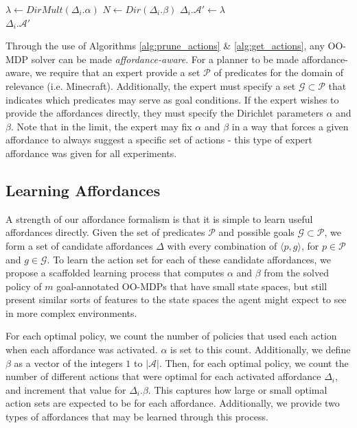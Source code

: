 \documentclass[conference]{IEEEtran}
\begin{document}
\begin{algorithm}
  \caption{$\Delta_i.getActions(s)$}
  \begin{algorithmic}[1]
    \State $\lambda \leftarrow DirMult(\Delta_i.\alpha)$
    \State $N \leftarrow Dir(\Delta_i.\beta)$
    \State $\Delta_i.\mathcal{A}' \leftarrow \lambda$
    \EndFor \\
    \Return $\Delta_i.\mathcal{A}'$
  \end{algorithmic}
  \label{alg:get_actions}
\end{algorithm}

Through the use of Algorithms \ref{alg:prune_actions} \& \ref{alg:get_actions}, any OO-MDP solver can be made
{\it affordance-aware}. For a planner to be made affordance-aware, we require that an expert provide a set $\mathcal{P}$ of predicates
for the domain of relevance (i.e. Minecraft). Additionally, the expert must specify a set
$\mathcal{G} \subset \mathcal{P}$ that indicates which predicates may serve as goal conditions. If the expert wishes
to provide the affordances directly, they must specify the Dirichlet parameters $\alpha$ and $\beta$. Note that
in the limit, the expert may fix $\alpha$ and $\beta$ in a way that forces a given
affordance to always suggest a specific set of actions - this type of expert affordance was given for all
experiments.

\subsection{Learning Affordances}

A strength of our affordance formalism is that it is simple to learn useful affordances directly.
Given the set of predicates $\mathcal{P}$ and possible goals $\mathcal{G} \subset \mathcal{P}$, we form a set of candidate affordances $\Delta$ with every combination of $\langle p, g \rangle$, for $p \in \mathcal{P}$ and $g \in \mathcal{G}$.
To learn the action set for each of these candidate affordances, we propose a scaffolded learning process that computes $\alpha$ and $\beta$ from the
solved policy of $m$ goal-annotated OO-MDPs that have small state spaces, but still present similar sorts of features to the state spaces the agent might expect to see in more complex environments.

For each optimal policy, we count the number of policies that used each action 
when each affordance was activated. $\alpha$ is set to this count. Additionally, we define $\beta$ as a vector of the integers $1$ to $|\mathcal{A}|$.
Then, for each optimal policy, we count the number of different actions that were optimal for each activated affordance $\Delta_i$, and increment
that value for $\Delta_i.\beta$. This captures how large or small optimal action sets are expected to be for each affordance. Additionally,
we provide two types of affordances that may be learned through this process.
\end{document}

